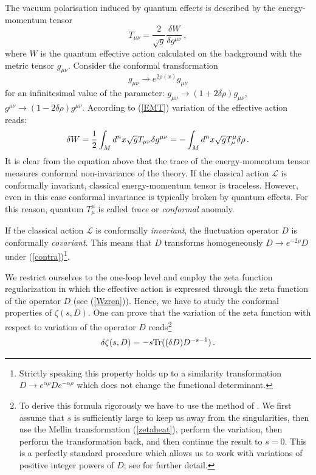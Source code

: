 The vacuum polarisation induced by quantum effects is described
by the energy-momentum tensor
\begin{equation}
T_{\mu\nu}=\frac 2{\sqrt{g}} \frac{\delta W}{\delta g^{\mu\nu}}
\,,\label{EMT}
\end{equation}
where $W$ is the quantum effective action calculated on the background
with the metric tensor $g_{\mu\nu}$. Consider the
conformal transformation 
\begin{equation}
g_{\mu\nu}\to e^{2\rho(x)}g_{\mu\nu} \label{contra}
\end{equation}
for an infinitesimal value of the parameter:
$g_{\mu\nu}\to (1+2\delta\rho )g_{\mu\nu}$,
$g^{\mu\nu}\to (1-2\delta\rho )g^{\mu\nu}$. According to (\ref{EMT})
variation of the effective action reads:
\begin{equation}
\delta W = \frac 12 \int_M d^nx\sqrt{g} T_{\mu\nu}\delta g^{\mu\nu}
=-\int_M d^nx\sqrt{g} T_\mu^\mu \delta \rho \,.\label{convarW}
\end{equation}
It is clear from the equation above that the trace of the energy-momentum
tensor measures conformal non-invariance of the theory. If the classical
action $\mathcal{L}$ is conformally invariant, classical energy-momentum
tensor is traceless. However, even in this case conformal invariance is
typically broken by quantum effects. For this reason, quantum $T_\mu^\mu$
is called {\it trace} or {\it conformal} anomaly.

If the classical action $\mathcal{L}$ is conformally {\it invariant},
the fluctuation operator $D$ is conformally {\it covariant}. This means
that $D$ transforms homogeneously $D\to e^{-2\rho}D$ under 
(\ref{contra})\footnote{Strictly speaking this property holds up to a
similarity transformation $D\to e^{\alpha\rho}De^{-\alpha\rho}$ which
does not change the functional determinant.}.

We restrict ourselves to the one-loop level and employ the zeta function
regularization in which the effective action is expressed through the
zeta function of the operator $D$ (see (\ref{Wzren})). Hence, we have to
study the conformal properties of $\zeta (s,D)$.
One can prove that the variation of the zeta function with
respect to variation of the operator $D$ reads\footnote{\label{ft}
To derive this formula rigorously we have to use the method
of \cite{Atiyah:1980jh,Romanov:1979sc}. We first assume that $s$ is 
sufficiently large to keep us away from the singularities, then
use the Mellin transformation (\ref{zetaheat}), perform the variation,
then perform the transformation back, and then continue the result
to $s=0$. This is a perfectly standard procedure which allows us to 
work with variations of positive integer powers of $D$; see 
\cite{Esposito:1997wt} for further detail.}
\begin{equation}
\delta \zeta (s,D)=-s {\rm Tr}((\delta D)D^{-s-1})\,.
\label{varizeta}
\end{equation}   

